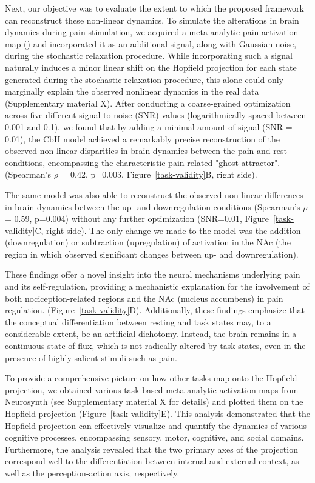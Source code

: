 \documentclass{article}
\begin{document}
Next, our objective was to evaluate the extent to which the proposed framework can reconstruct these non-linear dynamics.
To simulate the alterations in brain dynamics during pain stimulation, we acquired a meta-analytic pain activation map (\href{https://doi.org/10.1038/s41467-021-21179-3}{}) and incorporated it as an additional signal, along with Gaussian noise, during the stochastic relaxation procedure.
While incorporating such a signal naturally induces a minor linear shift on the Hopfield projection for each state generated during the stochastic relaxation procedure, this alone could only marginally explain the observed nonlinear dynamics in the real data (Supplementary material X).
After conducting a coarse-grained optimization across five different signal-to-noise (SNR) values (logarithmically spaced between 0.001 and 0.1), we found that by adding a minimal amount of signal (SNR = 0.01), the CbH model achieved a remarkably precise reconstruction of the observed non-linear disparities in brain dynamics between the pain and rest conditions, encompassing the characteristic pain related "ghost attractor". (Spearman's $\rho$ = 0.42, p=0.003, Figure~\ref{task-validity}B, right side).

The same model was also able to reconstruct the observed non-linear differences in brain dynamics between the up- and downregulation conditions (Spearman's $\rho$ = 0.59, p=0.004) without any further optimization (SNR=0.01, Figure~\ref{task-validity}C, right side).
The only change we made to the model was the addition (downregulation) or subtraction (upregulation) of activation in the NAc (the region in which \href{https://doi.org/10.1371/journal.pbio.1002036}{} observed significant changes between up- and downregulation).

These findings offer a novel insight into the neural mechanisms underlying pain and its self-regulation, providing a mechanistic explanation for the involvement of both nociception-related regions and the NAc (nucleus accumbens) in pain regulation. (Figure~\ref{task-validity}D).
Additionally, these findings emphasize that the conceptual differentiation between resting and task states may, to a considerable extent, be an artificial dichotomy. Instead, the brain remains in a continuous state of flux, which is not radically altered by task states, even in the presence of highly salient stimuli such as pain.


To provide a comprehensive picture on how other tasks map onto the Hopfield projection, we obtained various task-based meta-analytic activation maps from Neurosynth (see Supplementary material X for details) and plotted them on the Hopfield projection (Figure~\ref{task-validity}E). This analysis demonstrated that the Hopfield projection can effectively visualize and quantify the dynamics of various cognitive processes, encompassing sensory, motor, cognitive, and social domains. Furthermore, the analysis revealed that the two primary axes of the projection correspond well to the differentiation between internal and external context, as well as the perception-action axis, respectively.
\end{document}
